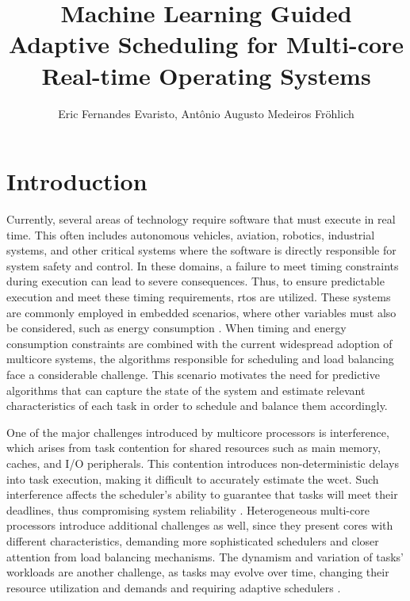 \documentclass[journal,onecolumn]{IEEEtran}
\begin{document}
\title{Machine Learning Guided Adaptive Scheduling for Multi-core Real-time Operating Systems}

\author{Eric Fernandes Evaristo, Antônio Augusto Medeiros Fröhlich}

\maketitle

\IEEEpeerreviewmaketitle

\section{Introduction}

Currently, several areas of technology require software that must execute in real time. This often includes autonomous vehicles, aviation, robotics, industrial systems, and other critical systems where the software is directly responsible for system safety and control. In these domains, a failure to meet timing constraints during execution can lead to severe consequences. Thus, to ensure predictable execution and meet these timing requirements, \gls{rtos} are utilized. These systems are commonly employed in embedded scenarios, where other variables must also be considered, such as energy consumption \cite{rahim2025survey}. When timing and energy consumption constraints are combined with the current widespread adoption of multicore systems, the algorithms responsible for scheduling and load balancing face a considerable challenge. This scenario motivates the need for predictive algorithms that can capture the state of the system and estimate relevant characteristics of each task in order to schedule and balance them accordingly.

One of the major challenges introduced by multicore processors is interference, which arises from task contention for shared resources such as main memory, caches, and I/O peripherals. This contention introduces non-deterministic delays into task execution, making it difficult to accurately estimate the \gls{wcet}. Such interference affects the scheduler's ability to guarantee that tasks will meet their deadlines, thus compromising system reliability \cite{aceituno2023optimized, lugo2022survey}. Heterogeneous multi-core processors introduce additional challenges as well, since they present cores with different characteristics, demanding more sophisticated schedulers and closer attention from load balancing mechanisms. The dynamism and variation of tasks' workloads are another challenge, as tasks may evolve over time, changing their resource utilization and demands and requiring adaptive schedulers \cite{mrabet2024scheduling, jadon2024comprehensive}.
\end{document}
